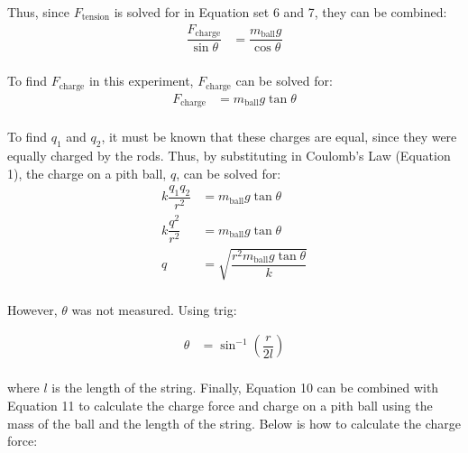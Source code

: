 \documentclass [12pt, letterpaper, twoside]{article}
\begin{document}
\begin{enumerate}
    \noindent
    Thus, since \(F_{\text{tension}}\) is solved for in Equation set 6 and 7, they can be combined:
    \begin{equation}
      \begin{split}
        \dfrac{F_{\text{charge}}}{\sin{\theta}} &= \dfrac{m_{\text{ball}}g}{\cos{\theta}} \\
      \end{split}
    \end{equation}

    \noindent
    To find \(F_{\text{charge}}\) in this experiment, \(F_{\text{charge}}\) can be solved for:
    \begin{equation}
      \begin{split} 
        F_{\text{charge}} &= m_{\text{ball}}g\tan{\theta} \\
      \end{split}
    \end{equation}

    \noindent
    To find \(q_{1}\) and \(q_{2}\), it must be known that these charges are equal, since they were equally charged by the rods. Thus, by substituting in Coulomb's Law (Equation 1), the charge on a pith ball, \(q\), can be solved for:
    \begin{equation}
      \begin{split}
        k\dfrac{q_{1}q_{2}}{r^2} &= m_{\text{ball}}g\tan{\theta} \\
        k\dfrac{q^2}{r^2} &= m_{\text{ball}}g\tan{\theta} \\
        q &= \sqrt{\dfrac{r^{2}m_{\text{ball}}g\tan{\theta}}{k}} \\
      \end{split}
    \end{equation}

    \noindent
    However, \(\theta\) was not measured. Using trig:

    \begin{equation}
      \begin{split}
        \theta &= \sin^{-1}\left(\dfrac{r}{2l}\right) \\
      \end{split}
    \end{equation}

    \noindent
    where \(l\) is the length of the string. Finally, Equation 10 can be combined with Equation 11 to calculate the charge force and charge on a pith ball using the mass of the ball and the length of the string. Below is how to calculate the charge force:


\end{enumerate}
\end{document}
